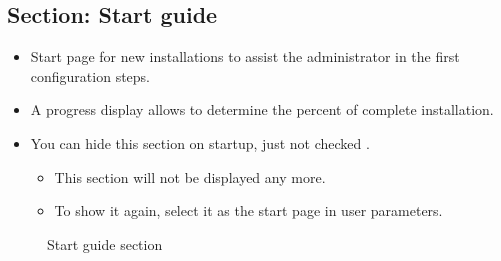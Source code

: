\documentclass[letterpaper,10pt,english]{sphinxmanual}
\begin{document}
\subsection{Section: Start guide}
\label{Today:section-start-guide}\begin{itemize}
\item {} 
Start page for new installations to assist the administrator in the first configuration steps.

\item {} 
A progress display  allows to determine the percent of complete installation.

\item {} 
You can hide this section on startup, just not checked .
\begin{itemize}
\item {} 
This section will not be displayed any more.

\item {} 
To show it again, select it as the start page in user parameters.

\end{itemize}

\end{itemize}
\begin{figure}[htbp]
\centering
\capstart

\caption{Start guide section}\end{figure}
\newpage
\end{document}
